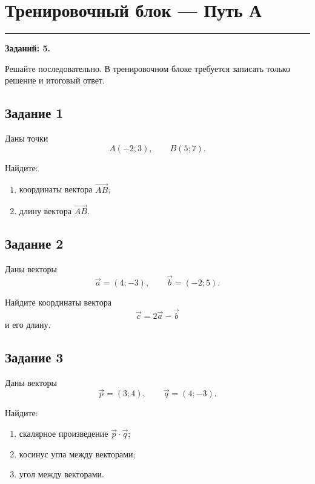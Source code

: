 \documentclass[a4paper,12pt]{article}
\newcommand{\vect}[1]{\overrightarrow{#1}}
\newcommand{\sectionline}{%
    \par\noindent
    {\color{accent}\rule{\linewidth}{0.6pt}}
    \par
}
\begin{document}
\section*{\color{darkaccent}Тренировочный блок --- Путь А}

\sectionline

\textbf{Заданий: 5.}

Решайте последовательно. В тренировочном блоке требуется записать
только решение и итоговый ответ.

\vspace{4mm}

\subsection*{Задание 1}

Даны точки
\[
A(-2;3),
\qquad
B(5;7).
\]

Найдите:

\begin{enumerate}[label=\alph*)]
    \item координаты вектора \(\vect{AB}\);
    \item длину вектора \(\vect{AB}\).
\end{enumerate}

\vspace{7mm}

\subsection*{Задание 2}

Даны векторы
\[
\vec a=(4;-3),
\qquad
\vec b=(-2;5).
\]

Найдите координаты вектора
\[
\vec c=2\vec a-\vec b
\]
и его длину.

\vspace{7mm}

\subsection*{Задание 3}

Даны векторы
\[
\vec p=(3;4),
\qquad
\vec q=(4;-3).
\]

Найдите:

\begin{enumerate}[label=\alph*)]
    \item скалярное произведение \(\vec p\cdot\vec q\);
    \item косинус угла между векторами;
    \item угол между векторами.
\end{enumerate}
\end{document}
